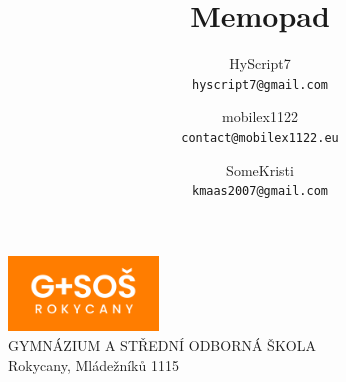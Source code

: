 \documentclass{article}
\title{
    \vfill
    \Huge{Memopad}
    \vfill
}
\author{
  HyScript7\\
  \texttt{hyscript7@gmail.com}
  \and
  mobilex1122\\
  \texttt{contact@mobilex1122.eu}
  \and
  SomeKristi\\
  \texttt{kmaas2007@gmail.com}
} %
\date{}
\begin{document}
    \begin{titlepage}
        \maketitle
        \vfill
        \begin{center}
            \includegraphics[width=0.3\textwidth]{graphics/gasos.png}\\
            \vspace{4mm}
            \centering
            \large{GYMNÁZIUM A STŘEDNÍ ODBORNÁ ŠKOLA}\\
            \large{Rokycany, Mládežníků 1115}
        \end{center}
        \thispagestyle{empty}
    \end{titlepage}
    \tableofcontents
    \null
    \newpage
    
    
    
    
    
    
\end{document}
